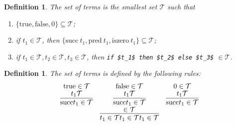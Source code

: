 \documentclass{article}
\newtheorem{definition}[theorem]{Definition}
\begin{document}
\begin{definition}
\rm The set of terms is the smallest set $\mathcal{T}$ such that 
\begin{enumerate}
	\item $\{\text{true},\text{false},0\} \subseteq \mathcal{T}$;
	\item if $t_1 \in \mathcal{T}$, then $\{\text{succ}\ t_1, \text{pred}\ t_1, \text{iszero}\ t_1\} \subseteq \mathcal{T}$;
	\item if $t_1 \in \mathcal{T}, t_2 \in \mathcal{T}, t_3 \in \mathcal{T}$, then {\lstinline[mathescape]!if $t_1$ then $t_2$ else $t_3$!} $\in \mathcal{T}$.
\end{enumerate}
\end{definition}

\begin{definition}
\rm The set of terms is defined by the following rules:
$$
\begin{array}{ccc}
\text{true} \in \mathcal{T}  & \text{false} \in \mathcal{T} & 0 \in \mathcal{T} \\
\infer{\text{succ} t_1 \in \mathcal{T}}{t_1 \mathcal{T}} & \infer{\text{succ} t_1 \in \mathcal{T}}{t_1 \mathcal{T}} & \infer{\text{succ} t_1 \in \mathcal{T}}{t_1 \mathcal{T}} \\
& \infer{t_1 \in \mathcal{T}  t_1 \in \mathcal{T}  t_1 \in \mathcal{T}}{ \in \mathcal{T}} &\\ 
\end{array}
$$
\end{definition}
\end{document}

